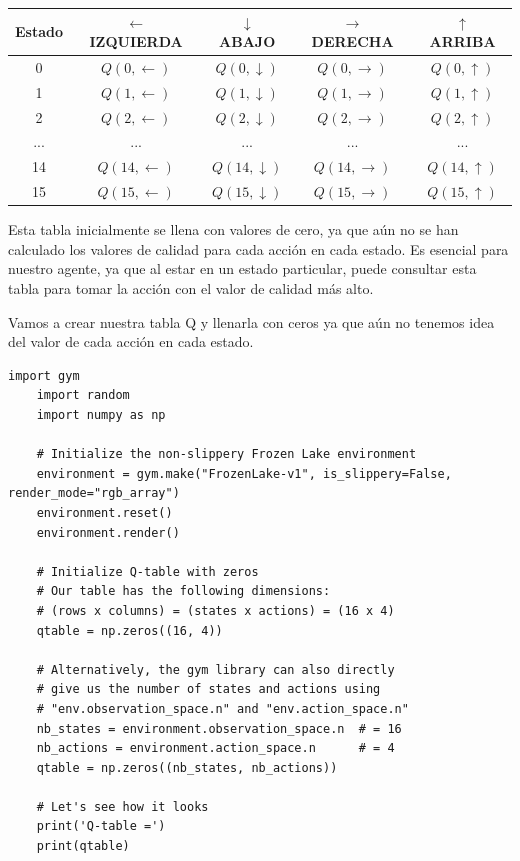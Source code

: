 \documentclass{article}
\begin{document}
\begin{center}
\begin{tabular}{|c|c|c|c|c|}
\hline
Estado & $\leftarrow$ IZQUIERDA & $\downarrow$ ABAJO & $\rightarrow$ DERECHA & $\uparrow$ ARRIBA \\
\hline
0 & $Q(0, \leftarrow)$ & $Q(0, \downarrow)$ & $Q(0, \rightarrow)$ & $Q(0, \uparrow)$ \\
1 & $Q(1, \leftarrow)$ & $Q(1, \downarrow)$ & $Q(1, \rightarrow)$ & $Q(1, \uparrow)$ \\
2 & $Q(2, \leftarrow)$ & $Q(2, \downarrow)$ & $Q(2, \rightarrow)$ & $Q(2, \uparrow)$ \\
... & ... & ... & ... & ... \\
14 & $Q(14, \leftarrow)$ & $Q(14, \downarrow)$ & $Q(14, \rightarrow)$ & $Q(14, \uparrow)$ \\
15 & $Q(15, \leftarrow)$ & $Q(15, \downarrow)$ & $Q(15, \rightarrow)$ & $Q(15, \uparrow)$ \\
\hline
\end{tabular}
\end{center}

\vspace{0.5cm}

Esta tabla inicialmente se llena con valores de cero, ya que aún no se han calculado los valores de calidad para cada acción en cada estado. Es esencial para nuestro agente, ya que al estar en un estado particular, puede consultar esta tabla para tomar la acción con el valor de calidad más alto.

\vspace{0.5cm}

Vamos a crear nuestra tabla Q y llenarla con ceros ya que aún no tenemos idea del valor de cada acción en cada estado.

\vspace{0.5cm}

\begin{lstlisting}[style=mystyle]
    import gym
    import random
    import numpy as np
    
    # Initialize the non-slippery Frozen Lake environment
    environment = gym.make("FrozenLake-v1", is_slippery=False, render_mode="rgb_array")
    environment.reset()
    environment.render()
    
    # Initialize Q-table with zeros
    # Our table has the following dimensions:
    # (rows x columns) = (states x actions) = (16 x 4)
    qtable = np.zeros((16, 4))
    
    # Alternatively, the gym library can also directly
    # give us the number of states and actions using 
    # "env.observation_space.n" and "env.action_space.n"
    nb_states = environment.observation_space.n  # = 16
    nb_actions = environment.action_space.n      # = 4
    qtable = np.zeros((nb_states, nb_actions))
    
    # Let's see how it looks
    print('Q-table =')
    print(qtable)
\end{lstlisting}
\end{document}
